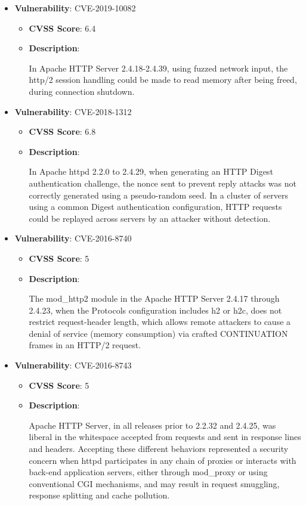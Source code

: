 \documentclass{article}
\begin{document}
\begin{itemize}
        \item \textbf{Vulnerability}: CVE-2019-10082
        \begin{itemize}
            \item \textbf{CVSS Score}:  6.4 
            \item \textbf{Description}:
            \parbox[t]{0.9\linewidth}{
                \ttfamily In Apache HTTP Server 2.4.18-2.4.39, using fuzzed network input, the http/2 session handling could be made to read memory after being freed, during connection shutdown.
            }
        \end{itemize}
    
        \item \textbf{Vulnerability}: CVE-2018-1312
        \begin{itemize}
            \item \textbf{CVSS Score}:  6.8 
            \item \textbf{Description}:
            \parbox[t]{0.9\linewidth}{
                \ttfamily In Apache httpd 2.2.0 to 2.4.29, when generating an HTTP Digest authentication challenge, the nonce sent to prevent reply attacks was not correctly generated using a pseudo-random seed. In a cluster of servers using a common Digest authentication configuration, HTTP requests could be replayed across servers by an attacker without detection.
            }
        \end{itemize}
    
        \item \textbf{Vulnerability}: CVE-2016-8740
        \begin{itemize}
            \item \textbf{CVSS Score}:  5 
            \item \textbf{Description}:
            \parbox[t]{0.9\linewidth}{
                \ttfamily The mod\_http2 module in the Apache HTTP Server 2.4.17 through 2.4.23, when the Protocols configuration includes h2 or h2c, does not restrict request-header length, which allows remote attackers to cause a denial of service (memory consumption) via crafted CONTINUATION frames in an HTTP/2 request.
            }
        \end{itemize}
    
        \item \textbf{Vulnerability}: CVE-2016-8743
        \begin{itemize}
            \item \textbf{CVSS Score}:  5 
            \item \textbf{Description}:
            \parbox[t]{0.9\linewidth}{
                \ttfamily Apache HTTP Server, in all releases prior to 2.2.32 and 2.4.25, was liberal in the whitespace accepted from requests and sent in response lines and headers. Accepting these different behaviors represented a security concern when httpd participates in any chain of proxies or interacts with back-end application servers, either through mod\_proxy or using conventional CGI mechanisms, and may result in request smuggling, response splitting and cache pollution.
            }
        \end{itemize}
    

\end{itemize}
\end{document}
